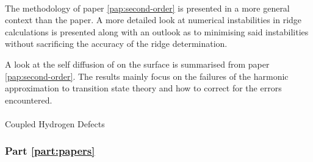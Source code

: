 \paragraph{}
The methodology of paper \ref{pap:second-order} is presented in a more general context than the paper.
A more detailed look at numerical instabilities in ridge calculations is presented along with an outlook as to minimising said instabilities without sacrificing the accuracy of the ridge determination.

A look at the self diffusion of  on the  surface is summarised from paper \ref{pap:second-order}.
The results mainly focus on the failures of the harmonic approximation to transition state theory and how to correct for the errors encountered.

\paragraph{}
Coupled Hydrogen Defects \expand

\subsubsection{Part \ref{part:papers}}
\placeholder
